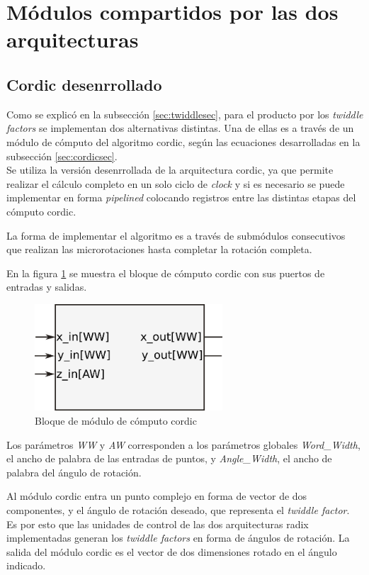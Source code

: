 \section{Módulos compartidos por las dos arquitecturas}
\subsection{Cordic desenrrollado}

Como se explicó en la subsección \ref{sec:twiddlesec}, para el producto por los \textit{twiddle
factors} se implementan dos alternativas distintas. Una de ellas es a través de un módulo de cómputo
del algoritmo cordic, según las ecuaciones desarrolladas en la subsección \ref{sec:cordicsec}.\\

Se utiliza la versión desenrrollada de la arquitectura cordic, ya que permite realizar el cálculo
completo en un solo ciclo de \textit{clock} y si es necesario se puede implementar en forma
\textit{pipelined} colocando registros entre las distintas etapas del cómputo cordic.

La forma de implementar el algoritmo es a través de submódulos consecutivos que realizan las
microrotaciones hasta completar la rotación completa.

En la figura \ref{fig:cordicDiam} se muestra el bloque de cómputo cordic con sus puertos de entradas
y salidas.

\begin{figure}[htb!]
        \centering
        \includegraphics[width=7cm]{./figures/cordicDiam.png}
        \caption{Bloque de módulo de cómputo cordic}
        \label{fig:cordicDiam}
\end{figure}

Los parámetros \textit{WW} y \textit{AW} corresponden a los parámetros globales \textit{Word\_Width},
el ancho de palabra de las entradas de puntos, y \textit{Angle\_Width}, el ancho de palabra del
ángulo de rotación.

Al módulo cordic entra un punto complejo en forma de vector de dos componentes, y el ángulo de
rotación deseado, que representa el \textit{twiddle factor}. Es por esto que las unidades de control
de las dos arquitecturas radix implementadas generan los \textit{twiddle factors} en forma de
ángulos de rotación.
La salida del módulo cordic es el vector de dos dimensiones rotado en el ángulo indicado.\\

